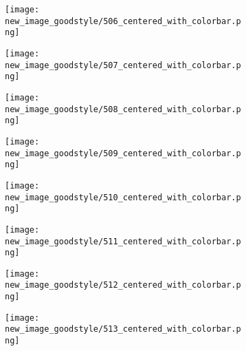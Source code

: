 \documentclass[a4paper,12pt]{article}
\begin{document}
\begin{figure}[H]
  \begin{subfigure}{0.11\textwidth}
    \texttt{[image: new\_image\_goodstyle/506\_centered\_with\_colorbar.png]}
  \end{subfigure}
  \hfill
  \begin{subfigure}{0.11\textwidth}
    \texttt{[image: new\_image\_goodstyle/507\_centered\_with\_colorbar.png]}
  \end{subfigure}
  \hfill
  \begin{subfigure}{0.11\textwidth}
    \texttt{[image: new\_image\_goodstyle/508\_centered\_with\_colorbar.png]}
  \end{subfigure}
  \hfill
  \begin{subfigure}{0.11\textwidth}
    \texttt{[image: new\_image\_goodstyle/509\_centered\_with\_colorbar.png]}
  \end{subfigure}
  \hfill
  \begin{subfigure}{0.11\textwidth}
    \texttt{[image: new\_image\_goodstyle/510\_centered\_with\_colorbar.png]}
  \end{subfigure}
  \hfill
  \begin{subfigure}{0.11\textwidth}
    \texttt{[image: new\_image\_goodstyle/511\_centered\_with\_colorbar.png]}
  \end{subfigure}
  \hfill
  \begin{subfigure}{0.11\textwidth}
    \texttt{[image: new\_image\_goodstyle/512\_centered\_with\_colorbar.png]}
  \end{subfigure}
  \hfill
  \begin{subfigure}{0.11\textwidth}
    \texttt{[image: new\_image\_goodstyle/513\_centered\_with\_colorbar.png]}
  \end{subfigure}
  \hfill
\end{figure}
\end{document}
